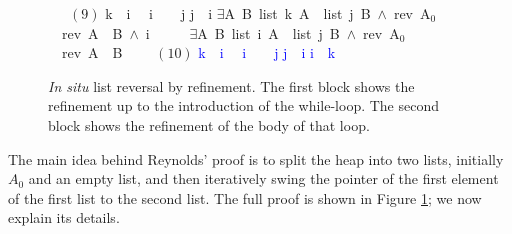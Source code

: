 \documentclass[twoside,runningheads,envcountsame,envcountsect,oribibl,orivec]{llncs}
\begin{document}
\begin{figure}
\begin{isabellebody}
\isanewline\ \ \ {\isasymsqsubseteq}\hfill $(9)$\isanewline
{\isacharbackquote}k\ {\isacharcolon}{\isacharequal}\ {\isacharat}{\isacharparenleft}{\isacharbackquote}i\ {\isacharplus}\ {}{\isacharparenright}{\isacharsemicolon}\isanewline
{\isacharat}{\isacharparenleft}{\isacharbackquote}i\ {\isacharplus}\ {}{\isacharparenright}\ {\isacharcolon}{\isacharequal}\ {\isacharbackquote}j{\isacharsemicolon}\isanewline
{\isacharbackquote}j\ {\isacharcolon}{\isacharequal}\ {\isacharbackquote}i{\isacharsemicolon}\isanewline
{\isasymlbrakk}{\isacharparenleft}$\exists$A\ B{\isachardot}\ {\isacharparenleft}list\ {\isacharbackquote}k\ A\ {\isacharasterisk}\ list\ {\isacharbackquote}j\ B{\isacharparenright}\ $\wedge$\ {\isacharparenleft}rev\ A$_0${\isacharparenright}\ {\isacharequal}\ {\isacharparenleft}rev\ A{\isacharparenright}\ {\isacharat}\ B{\isacharparenright}\ $\wedge$\ {\isacharbackquote}i\ {\isasymnoteq}\ {}{\isacharcomma}\ \isanewline
\ \ $\exists$A\ B{\isachardot}\ {\isacharparenleft}list\ {\isacharbackquote}i\ A\ {\isacharasterisk}\ list\ {\isacharbackquote}j\ B{\isacharparenright}\ $\wedge$\ {\isacharparenleft}rev\ A$_0${\isacharparenright}\ {\isacharequal}\ {\isacharparenleft}rev\ A{\isacharparenright}\ {\isacharat}\ B\ {\isasymrbrakk}
\isanewline\ \ \ {\isasymsqsubseteq}\hfill $(10)$\isanewline
\textcolor{blue}{{\isacharbackquote}k\ {\isacharcolon}{\isacharequal}\ {\isacharat}{\isacharparenleft}{\isacharbackquote}i\ {\isacharplus}\ {}{\isacharparenright}{\isacharsemicolon}\isanewline
{\isacharat}{\isacharparenleft}{\isacharbackquote}i\ {\isacharplus}\ {}{\isacharparenright}\ {\isacharcolon}{\isacharequal}\ {\isacharbackquote}j{\isacharsemicolon}\isanewline
{\isacharbackquote}j\ {\isacharcolon}{\isacharequal}\ {\isacharbackquote}i{\isacharsemicolon}\isanewline
{\isacharbackquote}i\ {\isacharcolon}{\isacharequal}\ {\isacharbackquote}k}
\end{isabellebody}
\caption{\emph{In situ} list reversal by refinement. The first block
shows the refinement up to the introduction of the while-loop. The
second block shows the refinement of the body of that loop.}
\label{fig:ref-reversal}
\end{figure}

The main idea behind Reynolds' proof is to split the heap into two
lists, initially $A_0$ and an empty list, and then iteratively swing
the pointer of the first element of the first list to the second list.
The full proof is shown in Figure \ref{fig:ref-reversal}; we now
explain its details.
\end{document}
